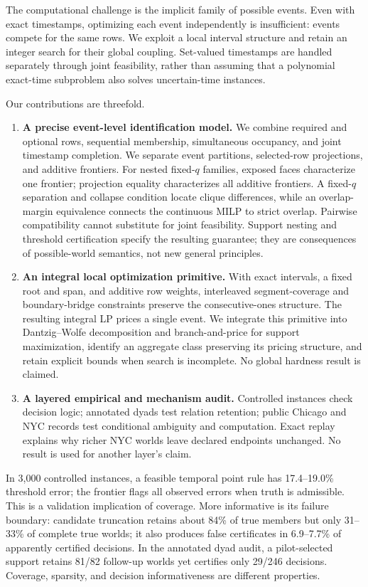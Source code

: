 The computational challenge is the implicit family of possible events.
Even with exact timestamps, optimizing each event independently is insufficient:
events compete for the same rows. We exploit a local interval structure and
retain an integer search for their global coupling. Set-valued timestamps are
handled separately through joint feasibility, rather than assuming that a
polynomial exact-time subproblem also solves uncertain-time instances.

Our contributions are threefold.
\begin{enumerate}[leftmargin=*,itemsep=2pt,topsep=3pt]
\item \textbf{A precise event-level identification model.} We combine required
and optional rows, sequential membership, simultaneous occupancy, and joint
timestamp completion. We separate event partitions, selected-row projections,
and additive frontiers. For nested fixed-$q$ families, exposed faces characterize
one frontier; projection equality characterizes all additive frontiers. A
fixed-$q$ separation and collapse condition locate clique differences, while an
overlap-margin equivalence connects the continuous MILP to strict overlap.
Pairwise compatibility cannot substitute for joint feasibility.
Support nesting and threshold certification specify the resulting guarantee;
they are consequences of possible-world semantics, not new general principles.
\item \textbf{An integral local optimization primitive.} With exact intervals,
a fixed root and span, and additive row weights, interleaved segment-coverage
and boundary-bridge constraints preserve the consecutive-ones structure. The
resulting integral LP prices a single event. We integrate this primitive into
Dantzig--Wolfe decomposition and branch-and-price for support maximization,
identify an aggregate class preserving its pricing structure, and retain
explicit bounds when search is incomplete. No global hardness result is claimed.
\item \textbf{A layered empirical and mechanism audit.} Controlled instances
check decision logic; annotated dyads test relation retention; public Chicago
and NYC records test conditional ambiguity and computation. Exact replay
explains why richer NYC worlds leave declared endpoints unchanged. No result is
used for another layer's claim.
\end{enumerate}

In 3,000 controlled instances, a feasible temporal point rule has
17.4--19.0\% threshold error; the frontier flags all observed errors when truth
is admissible. This is a validation implication of coverage. More informative
is its failure boundary: candidate truncation retains about 84\% of true
members but only 31--33\% of complete true worlds; it also produces false
certificates in 6.9--7.7\% of apparently certified decisions. In the annotated dyad
audit, a pilot-selected support retains 81/82 follow-up worlds yet certifies
only 29/246 decisions. Coverage, sparsity, and decision informativeness are
different properties.

